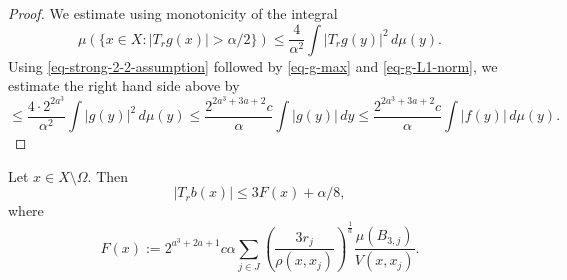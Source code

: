 \begin{proof}
    \leanok
    We estimate using monotonicity of the integral
\begin{equation*}
     \mu\left(\{x\in X: |T_r g(x)|>{\alpha}/2\}\right)\leq \frac{4}{\alpha^2} \int |T_r g(y)|^2\, d\mu(y).
\end{equation*}
Using \eqref{eq-strong-2-2-assumption} followed by \eqref{eq-g-max} and \eqref{eq-g-L1-norm}, we estimate the right hand side above by
\begin{equation}
    \label{eq-Hr-g}
    \leq \frac{4\cdot 2^{2a^3}}{\alpha^2} \int |g(y)|^2\, d\mu(y)\leq \frac{2^{2a^3+3a+2}c}{\alpha} \int |g(y)|\, dy \le \frac{2^{2a^3+3a+2}c}{\alpha} \int |f(y)|\, d\mu(y).
\end{equation}
\end{proof}

\begin{lemma}
    \label{estimate-bad-partial}
    \leanok
    Let $x\in X\setminus\Omega$. Then
    \begin{equation*}
        |T_rb(x)| \le 3F(x)+\alpha/8,
    \end{equation*}
    where
    \begin{equation*}
        F(x) := 2^{a^3+2a+1} c\alpha \sum_{j\in J} \left(\frac{3r_j}{\rho(x,x_j)}\right)^{\frac{1}{a}}\frac{\mu(B_{3,j})}{V(x,x_j)}.
    \end{equation*}
\end{lemma}

